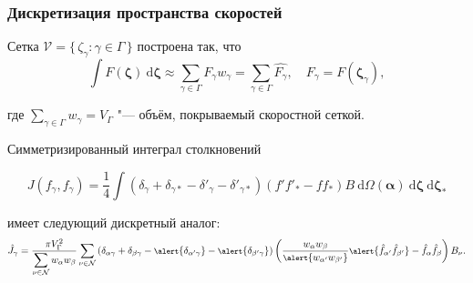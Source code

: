 \documentclass[mathserif]{beamer} %
\newcommand{\dd}{\:\mathrm{d}}
\newcommand{\dzeta}{\boldsymbol{\dd\zeta}}
\newcommand{\bzeta}{\boldsymbol{\zeta}}
\newcommand{\Nu}{\mathcal{N}}
\newcommand{\Set}[2]{\{\,{#1}:{#2}\,\}}
\begin{document}
\begin{frame}
    \frametitle{Дискретизация пространства скоростей}
    Сетка \(\mathcal{V} = \Set{\zeta_\gamma}{\gamma\in\Gamma}\) построена так, что
    \begin{equation}\label{eq:zeta_cubature}
        \int F(\bzeta) \dzeta \approx \sum_{\gamma\in\Gamma} F_\gamma w_\gamma =
            \sum_{\gamma\in\Gamma} \hat{F_\gamma},
            \quad F_\gamma = F(\bzeta_\gamma),
    \end{equation}\vspace{-10pt}

    где \(\sum_{\gamma\in\Gamma} w_\gamma = V_\Gamma\) "--- объём, покрываемый скоростной сеткой.
    \pause\vspace{20pt}

    Симметризированный интеграл столкновений\vspace{-20pt}

    \begin{equation}\label{eq:symm_ci}
        J(f_\gamma, f_\gamma) = \frac14\int \left(
            \delta_\gamma + \delta_{\gamma*} - \delta'_\gamma - \delta'_{\gamma*}
        \right) (f'f'_* - ff_*)B \dd\Omega(\boldsymbol{\alpha}) \dzeta\dzeta_*
    \end{equation}\vspace{-30pt}

    имеет следующий дискретный аналог:
    \begin{equation}\label{eq:discrete_symm_ci}
        \footnotesize
        \hat{J}_\gamma = \frac{\pi V_\Gamma^2}{\displaystyle\sum_{\nu\in\Nu} w_{\alpha}w_{\beta}}
            \sum_{\nu\in\Nu} \left(
                \delta_{\alpha\gamma} + \delta_{\beta\gamma} - \alert{\delta_{\alpha'\gamma}} - \alert{\delta_{\beta'\gamma}}
            \right)\left(
                \frac{w_{\alpha}w_{\beta}}{\alert{w_{\alpha'}w_{\beta'}}}
                \alert{\hat{f}_{\alpha'}\hat{f}_{\beta'}} - \hat{f}_{\alpha}\hat{f}_{\beta}
            \right)B_\nu.
    \end{equation}\vspace{-10pt}
\end{frame}
\end{document}

